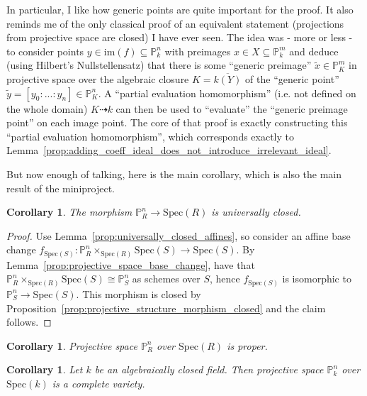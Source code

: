 \documentclass{scrartcl}
\renewcommand{\P}{\mathbb{P}}
\newcommand{\Spec}{\mathrm{Spec}}
\newcommand{\im}{\mathrm{im}}
\newtheorem{corollary}[subsection]{Corollary}
\theoremstyle{definition}
\begin{document}
In particular, I like how generic points are quite important for the proof.
It also reminds me of the only classical proof of an equivalent statement (projections from projective space are closed) I have ever seen.
The idea was - more or less - to consider points $y \in \im(f) \subseteq \P_k^n$ with preimages $x \in X \subseteq \P_k^m$ and deduce (using Hilbert's Nullstellensatz) that there is some ``generic preimage'' $\tilde{x} \in \P_K^m$ in projective space over the algebraic closure $K = \overline{k(Y)}$ of the ``generic point'' $\tilde{y} = [y_0 : ... : y_n] \in \P_K^n$.
A ``partial evaluation homomorphism'' (i.e. not defined on the whole domain) $K \dashrightarrow k$ can then be used to ``evaluate'' the ``generic preimage point'' on each image point.
The core of that proof is exactly constructing this ``partial evaluation homomorphism'', which corresponds exactly to Lemma~\ref{prop:adding_coeff_ideal_does_not_introduce_irrelevant_ideal}.

But now enough of talking, here is the main corollary, which is also the main result of the miniproject.
\begin{corollary}
    The morphism $\P_R^n \to \Spec(R)$ is universally closed.
\end{corollary}
\begin{proof}
    Use Lemma~\ref{prop:universally_closed_affines}, so consider an affine base change $f_{\Spec(S)}: \P_R^n \times_{\Spec(R)} \Spec(S) \to \Spec(S)$.
    By Lemma~\ref{prop:projective_space_base_change}, have that $\P_R^n \times_{\Spec(R)} \Spec(S) \cong \P_S^n$ as schemes over $S$, hence $f_{\Spec(S)}$ is isomorphic to $\P_S^n \to \Spec(S)$.
    This morphism is closed by Proposition~\ref{prop:projective_structure_morphism_closed} and the claim follows.
\end{proof}
\begin{corollary}
    Projective space $\P_R^n$ over $\Spec(R)$ is proper.
\end{corollary}
\begin{corollary}
    Let $k$ be an algebraically closed field.
    Then projective space $\P_k^n$ over $\Spec(k)$ is a complete variety.
\end{corollary}
\end{document}
